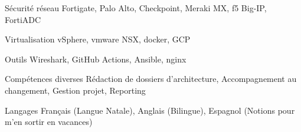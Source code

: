 

\begin{cvskills}

  \cvskill
    {Sécurité réseau} %
    {Fortigate, Palo Alto, Checkpoint, Meraki MX, f5 Big-IP, FortiADC} %

  \cvskill
    {Virtualisation} %
    {vSphere, vmware NSX, docker, GCP} %

  \cvskill
    {Outils} %
    {Wireshark, GitHub Actions, Ansible, nginx} %

  \cvskill
    {Compétences diverses} %
    {Rédaction de dossiers d'architecture, Accompagnement au changement, Gestion projet, Reporting} %

  \cvskill
    {Langages} %
    {Français (Langue Natale), Anglais (Bilingue), Espagnol (Notions pour m'en sortir en vacances)} %

\end{cvskills}
